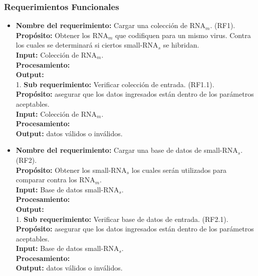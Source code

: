\documentclass[12pt,a4paper,spanish]{article}
\begin{document}
	\subsubsection{Requerimientos Funcionales}
	\begin{itemize}
		\item \textbf{Nombre del requerimiento:} Cargar una colección de RNA$_m$. (RF1).\\
 	    \textbf{Propósito:} Obtener los RNA$_m$ que codifiquen para un mismo virus. Contra los cuales se determinará si 								ciertos small-RNA$_s$ se hibridan.\\
		\textbf{Input:} Colección de RNA$_m$.\\
		\textbf{Procesamiento:} \\
		\textbf{Output:} \\

		1. \textbf{Sub requerimiento:} Verificar colección de entrada. (RF1.1).\\
 	    \textbf{Propósito:} asegurar que los datos ingresados están dentro de los parámetros aceptables. \\
		\textbf{Input:} Colección de RNA$_m$.\\
		\textbf{Procesamiento:} \\
		\textbf{Output:} datos válidos o inválidos.\\

		\item \textbf{Nombre del requerimiento:} Cargar una base de datos de small-RNA$_s$. (RF2).\\
 	    \textbf{Propósito:} Obtener los small-RNA$_s$ los cuales serán utilizados para comparar contra los RNA$_m$.\\
		\textbf{Input:} Base de datos small-RNA$_s$.\\
		\textbf{Procesamiento:} \\
		\textbf{Output:} \\
	
		1. \textbf{Sub requerimiento:} Verificar base de datos de entrada. (RF2.1).\\
 	    \textbf{Propósito:} asegurar que los datos ingresados están dentro de los parámetros aceptables. \\
		\textbf{Input:} Base de datos small-RNA$_s$.\\
		\textbf{Procesamiento:} \\
		\textbf{Output:} datos válidos o inválidos.\\


\end{itemize}
\end{document}
